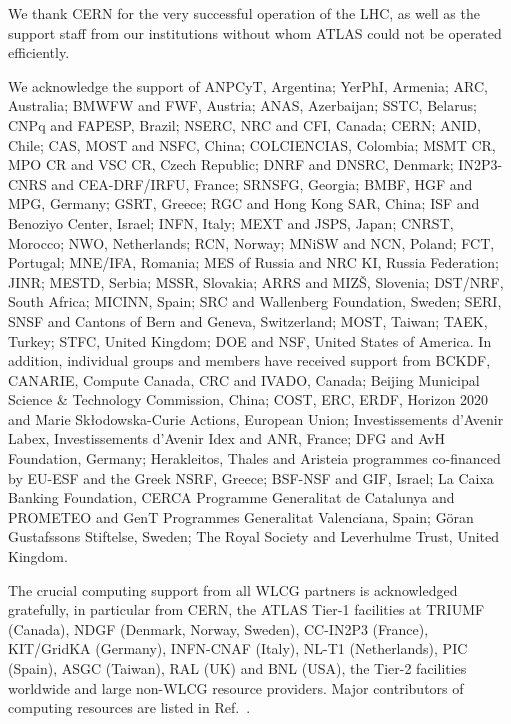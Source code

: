 

We thank CERN for the very successful operation of the LHC, as well as the
support staff from our institutions without whom ATLAS could not be
operated efficiently.

We acknowledge the support of ANPCyT, Argentina; YerPhI, Armenia; ARC, Australia; BMWFW and FWF, Austria; ANAS, Azerbaijan; SSTC, Belarus; CNPq and FAPESP, Brazil; NSERC, NRC and CFI, Canada; CERN; ANID, Chile; CAS, MOST and NSFC, China; COLCIENCIAS, Colombia; MSMT CR, MPO CR and VSC CR, Czech Republic; DNRF and DNSRC, Denmark; IN2P3-CNRS and CEA-DRF/IRFU, France; SRNSFG, Georgia; BMBF, HGF and MPG, Germany; GSRT, Greece; RGC and Hong Kong SAR, China; ISF and Benoziyo Center, Israel; INFN, Italy; MEXT and JSPS, Japan; CNRST, Morocco; NWO, Netherlands; RCN, Norway; MNiSW and NCN, Poland; FCT, Portugal; MNE/IFA, Romania; MES of Russia and NRC KI, Russia Federation; JINR; MESTD, Serbia; MSSR, Slovakia; ARRS and MIZ\v{S}, Slovenia; DST/NRF, South Africa; MICINN, Spain; SRC and Wallenberg Foundation, Sweden; SERI, SNSF and Cantons of Bern and Geneva, Switzerland; MOST, Taiwan; TAEK, Turkey; STFC, United Kingdom; DOE and NSF, United States of America. In addition, individual groups and members have received support from BCKDF, CANARIE, Compute Canada, CRC and IVADO, Canada; Beijing Municipal Science \& Technology Commission, China; COST, ERC, ERDF, Horizon 2020 and Marie Sk{\l}odowska-Curie Actions, European Union; Investissements d'Avenir Labex, Investissements d'Avenir Idex and ANR, France; DFG and AvH Foundation, Germany; Herakleitos, Thales and Aristeia programmes co-financed by EU-ESF and the Greek NSRF, Greece; BSF-NSF and GIF, Israel; La Caixa Banking Foundation, CERCA Programme Generalitat de Catalunya and PROMETEO and GenT Programmes Generalitat Valenciana, Spain; G\"{o}ran Gustafssons Stiftelse, Sweden; The Royal Society and Leverhulme Trust, United Kingdom.

The crucial computing support from all WLCG partners is acknowledged gratefully, in particular from CERN, the ATLAS Tier-1 facilities at TRIUMF (Canada), NDGF (Denmark, Norway, Sweden), CC-IN2P3 (France), KIT/GridKA (Germany), INFN-CNAF (Italy), NL-T1 (Netherlands), PIC (Spain), ASGC (Taiwan), RAL (UK) and BNL (USA), the Tier-2 facilities worldwide and large non-WLCG resource providers. Major contributors of computing resources are listed in Ref.~\cite{ATL-SOFT-PUB-2020-001}.

